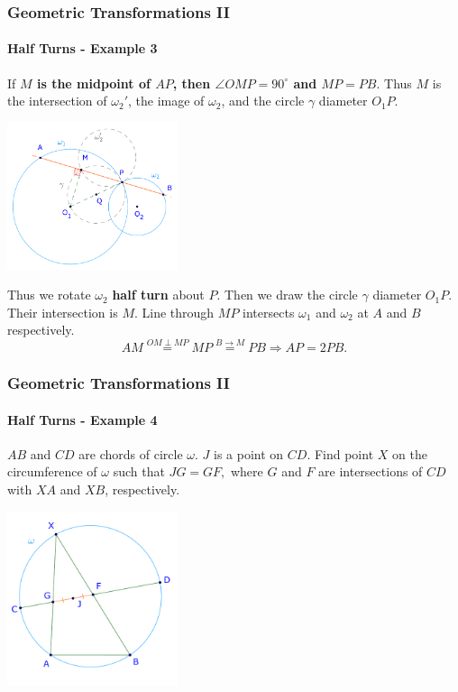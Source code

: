 \documentclass[8pt,xcolor=table,dvipsnames]{beamer}
\newcommand{\dg}{^\circ}
\begin{document}
\begin{frame}[t]
    \frametitle{Geometric Transformations II}
    \framesubtitle{Half Turns - Example 3}
    If \textbf{$M$ is the midpoint of $AP$, then $\angle OMP = 90\dg$ and $MP = PB$}.
    Thus $M$ is the intersection of $\omega_2'$, the image of $\omega_2$, and the circle $\gamma$ diameter $O_1P.$
    \begin{center}
        \includegraphics[width=5cm]{./svg/pdf/rotation-2b.pdf}
    \end{center}
    Thus we rotate $\omega_2$ \textbf{half turn} about $P$.
    Then we draw the circle $\gamma$ diameter $O_1P.$
    Their intersection is $M$. Line through $MP$ intersects $\omega_1$ and $\omega_2$ at $A$ and $B$ respectively.
    \[
        AM \stackrel{OM \perp MP}{=} MP \stackrel{B \rightarrow M}{=} PB \Rightarrow AP = 2PB.
    \]
\end{frame}

\begin{frame}[t]
    \frametitle{Geometric Transformations II}
    \framesubtitle{Half Turns - Example 4}
    \begin{example}
        $AB$ and $CD$ are chords of circle $\omega$. $J$ is a point on $CD$. Find point $X$ on the circumference of $\omega$ such that $JG = GF,$
        where $G$ and $F$ are intersections of $CD$ with $XA$ and $XB$, respectively.
    \end{example}

    \begin{center}
        \includegraphics[width=5cm]{./svg/pdf/rotation-3a.pdf}
    \end{center}
\end{frame}
\end{document}

